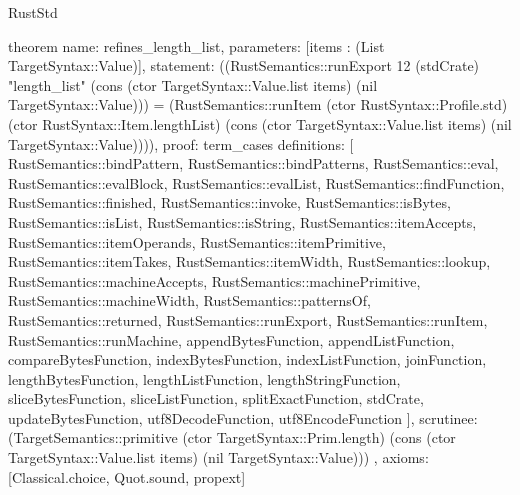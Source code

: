 \begin{lexlean}{RustStd}
\begin{semanticmodule}
theorem{
  name: refines_length_list,
  parameters: [items : (List TargetSyntax::Value)],
  statement: ((RustSemantics::runExport 12 (stdCrate) "length_list" (cons (ctor TargetSyntax::Value.list items) (nil TargetSyntax::Value))) = (RustSemantics::runItem (ctor RustSyntax::Profile.std) (ctor RustSyntax::Item.lengthList) (cons (ctor TargetSyntax::Value.list items) (nil TargetSyntax::Value)))),
  proof: term_cases{
    definitions: [
      RustSemantics::bindPattern,
      RustSemantics::bindPatterns,
      RustSemantics::eval,
      RustSemantics::evalBlock,
      RustSemantics::evalList,
      RustSemantics::findFunction,
      RustSemantics::finished,
      RustSemantics::invoke,
      RustSemantics::isBytes,
      RustSemantics::isList,
      RustSemantics::isString,
      RustSemantics::itemAccepts,
      RustSemantics::itemOperands,
      RustSemantics::itemPrimitive,
      RustSemantics::itemTakes,
      RustSemantics::itemWidth,
      RustSemantics::lookup,
      RustSemantics::machineAccepts,
      RustSemantics::machinePrimitive,
      RustSemantics::machineWidth,
      RustSemantics::patternsOf,
      RustSemantics::returned,
      RustSemantics::runExport,
      RustSemantics::runItem,
      RustSemantics::runMachine,
      appendBytesFunction,
      appendListFunction,
      compareBytesFunction,
      indexBytesFunction,
      indexListFunction,
      joinFunction,
      lengthBytesFunction,
      lengthListFunction,
      lengthStringFunction,
      sliceBytesFunction,
      sliceListFunction,
      splitExactFunction,
      stdCrate,
      updateBytesFunction,
      utf8DecodeFunction,
      utf8EncodeFunction
    ],
    scrutinee: (TargetSemantics::primitive (ctor TargetSyntax::Prim.length) (cons (ctor TargetSyntax::Value.list items) (nil TargetSyntax::Value)))
  },
  axioms: [Classical.choice, Quot.sound, propext]
}


\end{semanticmodule}
\end{lexlean}
